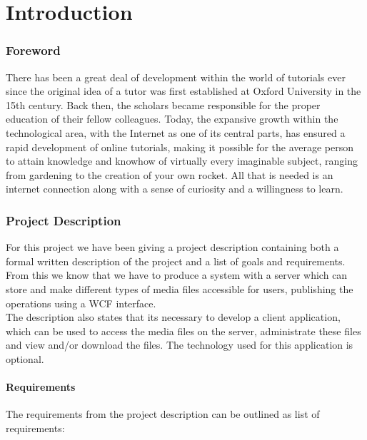 \part{Introduction}
\section{Foreword}
There has been a great deal of development within the world of tutorials ever since the original idea of a tutor was first established at Oxford University in the 15th century. Back then, the scholars became responsible for the proper education of their fellow colleagues. Today, the expansive growth within the technological area, with the Internet as one of its central parts, has ensured a rapid development of online tutorials, making it possible for the average person to attain knowledge and knowhow of virtually every imaginable subject, ranging from gardening to the creation of your own rocket.
All that is needed is an internet connection along with a sense of curiosity and a willingness to learn.\\


\section{Project Description}
For this project we have been giving a project description containing both a formal written description of the project and a list of goals and requirements. From this we know that we have to produce a system with a server which can store and make different types of media files accessible for users, publishing the operations using a WCF interface.\\
The description also states that its necessary to develop a client application, which can be used to access the media files on the server, administrate these files and view and/or download the files. The technology used for this application is optional.\\

\subsection{Requirements}
The requirements from the project description can be outlined as list of requirements:
